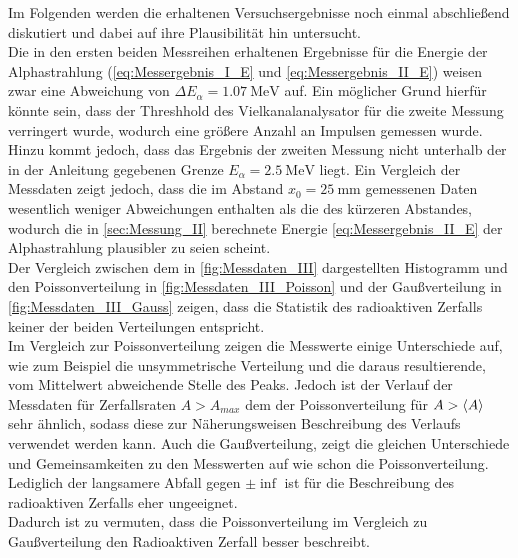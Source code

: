 Im Folgenden werden die erhaltenen Versuchsergebnisse noch einmal
abschließend diskutiert und dabei auf ihre Plausibilität hin untersucht.\\

Die in den ersten beiden Messreihen erhaltenen Ergebnisse für die 
Energie der Alphastrahlung (\cref{eq:Messergebnis_I_E} und \cref{eq:Messergebnis_II_E})
weisen zwar eine Abweichung von $\Delta E_{\alpha} = \SI{1.07}{\mega\eV}$ auf. 
Ein möglicher Grund hierfür könnte sein, dass der Threshhold des Vielkanalanalysator
für die zweite Messung verringert wurde, wodurch eine größere Anzahl an Impulsen gemessen
wurde.   
Hinzu kommt jedoch, dass das Ergebnis der zweiten Messung nicht unterhalb der
in der Anleitung \cite{V701} gegebenen Grenze $E_{\alpha} = \SI{2.5}{\mega\eV}$ liegt.
Ein Vergleich der Messdaten zeigt jedoch, dass die im Abstand $x_{0} = \SI{25}{\milli\meter}$ 
gemessenen Daten wesentlich weniger Abweichungen enthalten als die des kürzeren Abstandes,
wodurch die in \cref{sec:Messung_II}  berechnete Energie \cref{eq:Messergebnis_II_E} 
der Alphastrahlung plausibler zu seien scheint. \\

Der Vergleich zwischen dem in \cref{fig:Messdaten_III} dargestellten Histogramm und 
den Poissonverteilung in \cref{fig:Messdaten_III_Poisson} und der Gaußverteilung in
\cref{fig:Messdaten_III_Gauss} zeigen, dass die Statistik des radioaktiven Zerfalls
keiner der beiden Verteilungen entspricht.  \\
Im Vergleich zur Poissonverteilung zeigen die Messwerte einige Unterschiede auf,
wie zum Beispiel die unsymmetrische Verteilung und die daraus resultierende,
vom Mittelwert abweichende Stelle des Peaks. Jedoch ist der Verlauf der Messdaten für
Zerfallsraten $A > A_{max}$ dem der Poissonverteilung  für $A > \langle A\rangle$ sehr ähnlich, 
sodass diese zur Näherungsweisen Beschreibung des Verlaufs verwendet werden kann. 
Auch die Gaußverteilung, zeigt die gleichen Unterschiede und Gemeinsamkeiten zu den Messwerten
auf wie schon die Poissonverteilung. Lediglich der langsamere Abfall gegen $\pm \inf$ 
ist für die Beschreibung des radioaktiven Zerfalls eher ungeeignet.\\
Dadurch ist zu vermuten, dass die Poissonverteilung im Vergleich zu Gaußverteilung den Radioaktiven Zerfall besser beschreibt. 